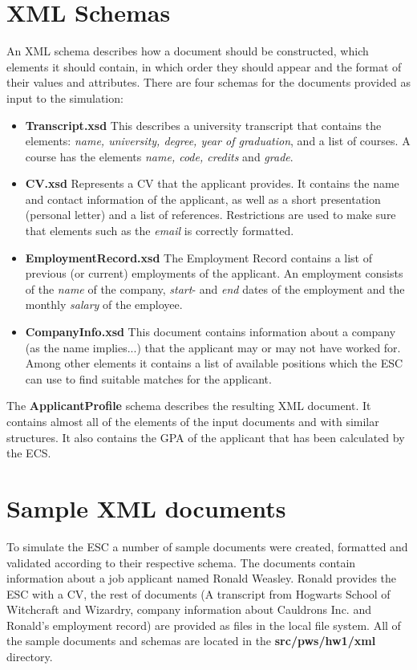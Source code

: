 \documentclass[conference, a4paper]{IEEEtran}
\begin{document}
\section{XML Schemas}
An XML schema describes how a document should be constructed, which elements it should contain, in which order they should appear and the format of their values and attributes. There are four schemas for the documents provided as input to the simulation: 
\begin{itemize}
	\item \textbf{Transcript.xsd} This describes a university transcript that contains the elements: \textit{name, university, degree, year of graduation}, and a list of courses. A course has the elements \textit{name, code, credits} and \textit{grade}.
	\item \textbf{CV.xsd} Represents a CV that the applicant provides. It contains the name and contact information of the applicant, as well as a short presentation (personal letter) and a list of references. Restrictions are used to make sure that elements such as the \textit{email} is correctly formatted.
	\item \textbf{EmploymentRecord.xsd} The Employment Record contains a list of previous (or current) employments of the applicant. An employment consists of the \textit{name} of the company, \textit{start}- and \textit{end} dates of the employment and the monthly \textit{salary} of the employee.
	\item \textbf{CompanyInfo.xsd} This document contains information about a company (as the name implies...) that the applicant may or may not have worked for. Among other elements it contains a list of available positions which the ESC can use to find suitable matches for the applicant.
\end{itemize}
The \textbf{ApplicantProfile} schema describes the resulting XML document. It contains almost all of the elements of the input documents and with similar structures. It also contains the GPA of the applicant that has been calculated by the ECS.

\section{Sample XML documents}
To simulate the ESC a number of sample documents were created, formatted and validated according to their respective schema. The documents contain information about a job applicant named Ronald Weasley. Ronald provides the ESC with a CV, the rest of documents (A transcript from Hogwarts School of Witchcraft and Wizardry, company information about Cauldrons Inc. and Ronald's employment record) are provided as files in the local file system. All of the sample documents and schemas are located in the \textbf{src/pws/hw1/xml} directory.
\end{document}

